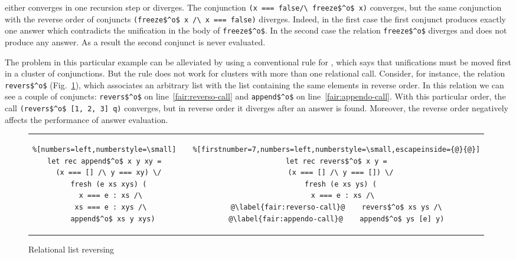 either converges in one recursion step or diverges. The conjunction \lstinline{(x === false/\ freeze$^o$ x)} converges, but the same conjunction with the reverse order of conjuncts
\lstinline{(freeze$^o$ x /\ x === false)} diverges. Indeed, in the first case the first conjunct produces exactly one answer which contradicts the unification in the body
of \lstinline{freeze$^o$}. In the second case the relation \lstinline{freeze$^o$} diverges and does not produce any answer. As a result the second conjunct
is never evaluated.

The problem in this particular example can be alleviated by using a conventional rule for \mk, which says that unifications must be moved first in a cluster of conjunctions.
But the rule does not work for clusters with more than one relational call. Consider, for instance, the relation \lstinline{revers$^o$} (Fig.~\ref{fair:lst-reverso}), which associates
an arbitrary list with the list containing the same elements in reverse order. In this relation we can see a couple of conjuncts: \lstinline{revers$^o$} on line~\ref{fair:reverso-call} and
\lstinline{append$^o$} on line~\ref{fair:appendo-call}. With this particular order, the call \lstinline{(revers$^o$ [1, 2, 3] q)} converges, but in reverse order it diverges after an answer
is found. Moreover, the reverse order negatively affects the performance of answer evaluation.

\begin{figure}[h]
\centering
\begin{tabular}{cp{3cm}c}
\begin{lstlisting}%[numbers=left,numberstyle=\small]
let rec append$^o$ x y xy =
  (x === [] /\ y === xy) \/
  fresh (e xs xys) (
    x === e : xs /\ 
    xs === e : xys /\ 
    append$^o$ xs y xys)
\end{lstlisting}
& &
\begin{lstlisting}%[firstnumber=7,numbers=left,numberstyle=\small,escapeinside={@}{@}]
let rec revers$^o$ x y =
  (x === [] /\ y === []) \/
  fresh (e xs ys) (
    x === e : xs /\ 
@\label{fair:reverso-call}@    revers$^o$ xs ys /\
@\label{fair:appendo-call}@    append$^o$ ys [e] y)
\end{lstlisting}
\end{tabular}

\caption{Relational list reversing}
\label{fair:lst-reverso}
\end{figure}

